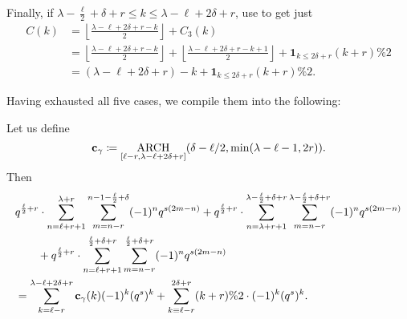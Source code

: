 \begin{enumerate}
  \ii Finally, if $\lambda - \frac{\ell}{2} + \delta + r \le k \le \lambda - \ell + 2 \delta + r$,
  use  to get just
  \begin{align*}
    C(k) &= \left\lfloor \frac{\lambda - \ell + 2\delta + r - k}{2} \right\rfloor + C_3(k) \\
    &= \left\lfloor \frac{\lambda - \ell + 2\delta + r - k}{2} \right\rfloor +
      \left\lfloor \frac{\lambda - \ell + 2\delta + r - k + 1}{2} \right\rfloor
      + \mathbf{1}_{k \le 2 \delta + r} (k + r) \% 2 \\
    &= (\lambda - \ell + 2 \delta + r) - k + \mathbf{1}_{k \le 2 \delta + r} (k + r) \% 2.
  \end{align*}
\end{enumerate}
Having exhausted all five cases, we compile them into the following:
\begin{proposition}
  \label{prop:ell_even_top_coeff}
  Let us define
  \[
    \mathbf c_\gamma \coloneqq \operatorname*{ARCH}_{[\ell-r, \lambda - \ell + 2\delta + r]}
    (\delta - \ell/2, \min(\lambda-\ell-1, 2r)).
  \]
  Then
  \begin{align*}
  & q^{\frac{\ell}{2}+r} \cdot \sum_{n=\ell+r+1}^{\lambda+r}
    \sum_{m=n-r}^{n-1-\frac{\ell}{2}+\delta}
    (-1)^n q^{s(2m-n)}
  + q^{\frac{\ell}{2}+r} \cdot \sum_{n=\lambda+r+1}^{\lambda-\frac{\ell}{2}+\delta+r}
    \sum_{m=n-r}^{\lambda-\frac{\ell}{2}+\delta+r}
    (-1)^n q^{s(2m-n)} \\
  &\qquad+ q^{\frac{\ell}{2}+r} \cdot \sum_{n=\ell+r+1}^{\frac{\ell}{2}+\delta+r}
    \sum_{m=n-r}^{\frac{\ell}{2}+\delta+r}
    (-1)^n q^{s(2m-n)} \\
  &= \sum_{k=\ell-r}^{\lambda-\ell+2\delta+r} \mathbf c_\gamma(k) (-1)^k (q^s)^k
    + \sum_{k \equiv \ell-r}^{2\delta+r} (k+r)\%2 \cdot (-1)^k (q^s)^k.
  \end{align*}
\end{proposition}
